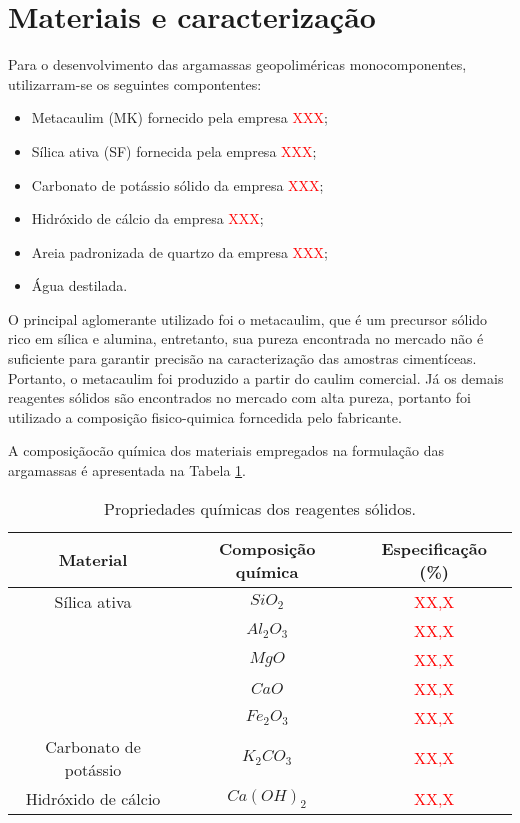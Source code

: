 \section{Materiais e caracterização}

Para o desenvolvimento das argamassas geopoliméricas monocomponentes, utilizarram-se os seguintes compontentes:

\begin{itemize}
    \item Metacaulim (MK) fornecido pela empresa \textcolor{red}{XXX};
    \item Sílica ativa (SF) fornecida pela empresa \textcolor{red}{XXX};
    \item Carbonato de potássio sólido da empresa \textcolor{red}{XXX};
    \item Hidróxido de cálcio da empresa \textcolor{red}{XXX};
    \item Areia padronizada de quartzo da empresa \textcolor{red}{XXX};
    \item Água destilada.
\end{itemize}

O principal aglomerante utilizado foi o metacaulim, que é um precursor sólido rico em sílica e alumina, entretanto, sua pureza encontrada no mercado não é suficiente para garantir precisão na caracterização das amostras cimentíceas.
Portanto, o metacaulim foi produzido a partir do caulim comercial.
Já os demais reagentes sólidos são encontrados no mercado com alta pureza, portanto foi utilizado a composição fisico-quimica forncedida pelo fabricante.

A composiçãocão química dos materiais empregados na formulação das argamassas é apresentada na Tabela \ref{tab:composicao_quimica_reagentes}.

\begin{table}[htb]
    \caption{Propriedades químicas dos reagentes sólidos.}
    \label{tab:composicao_quimica_reagentes}
    \center
    \begin{tabular}{ccc}
        \hline
        Material & Composição química & Especificação (\%)\\
        \hline
        Sílica ativa & $SiO_2$ &  \textcolor{red}{XX,X} \\
            & $ Al_2O_3$ & \textcolor{red}{XX,X} \\
            & $MgO$ & \textcolor{red}{XX,X} \\
            & $CaO$ & \textcolor{red}{XX,X} \\
            & $Fe_2O_3$ & \textcolor{red}{XX,X} \\
        Carbonato de potássio & $K_2CO_3$ & \textcolor{red}{XX,X} \\
        Hidróxido de cálcio & $Ca(OH)_2$ & \textcolor{red}{XX,X} \\
        \hline
    \end{tabular}
\end{table}

